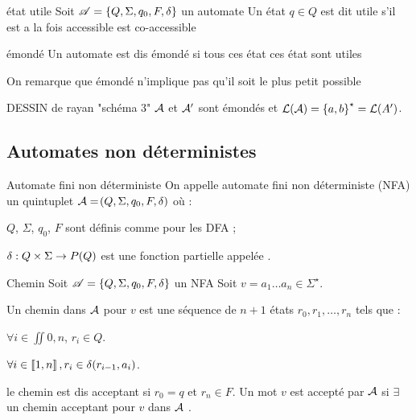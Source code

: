     
    \begin{definition}{état utile}
        Soit $\mathscr{A} = \left\{Q, \Sigma, q_0, F, \delta\right\}$ un automate
        Un état $q \in Q$ est dit utile s'il est a la fois accessible est co-accessible 
        
    \end{definition}
    \begin{definition}{émondé}{}
        Un automate est dis émondé si tous ces état ces état sont utiles 
    \end{definition}
    On remarque que émondé n'implique pas qu'il soit le plus petit possible  
    
    \begin{example}{}{}
        \text{}\newline
        DESSIN de rayan "schéma 3"  
        \newline 
        $\mathcal{A}$ et $\mathcal{A}'$ sont émondés et $\mathcal{L}\!\left(\mathcal{A}\right) = \left\{a, b\right\}^\star = \mathcal{L}\!\left(A'\right)$.
    \end{example}
    
    \subsection{Automates non déterministes}
    
    \begin{definition}{Automate fini non déterministe}
        On appelle automate fini non déterministe (NFA) un quintuplet $\mathcal{A} = \!\left(Q, \Sigma, q_0, F, \delta\right)$ où :
        \begin{enumerate}
            \itast $Q$, $\Sigma$, $q_0$, $F$ sont définis comme pour les DFA ;
            
            \itast $\delta : Q \times \Sigma \to P\!\left(Q\right)$ est une fonction partielle appelée .
        \end{enumerate}
    \end{definition}

    \begin{definition}{Chemin}{}
        Soit $\mathscr{A} = \left\{Q, \Sigma, q_0, F, \delta\right\}$ un NFA 
        Soit $v = a_1 \dots a_n \in \Sigma^\star$.
        
        Un chemin dans $\mathcal{A}$ pour $v$ est une séquence de $n+1$ états $r_0, r_1, \dots, r_n$ tels que :
        
        \begin{enumerate}
            \itast $\forall i \in \iint{0, n}$, $r_i \in Q$.
            
            \itast $\forall i \in \left\llbracket1, n\right\rrbracket, r_i \in \delta\!\left(r_{i-1}, a_i\right)$.
        \end{enumerate}
    
    le chemin est dis acceptant si $r_0=q$ et $r_n \in F$.
    Un mot $v$  est accepté par $\mathcal{A}$ si $\exists$ un chemin acceptant pour $v$ dans $\mathcal{A}$ . 
    
    
    
    \end{definition}
    
